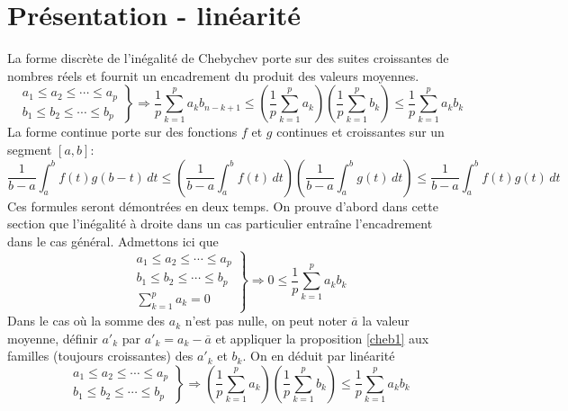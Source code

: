 
\section{Présentation - linéarité}
La forme discrète de l'inégalité de Chebychev porte sur des suites croissantes de nombres réels et fournit un encadrement du produit des valeurs moyennes.
\begin{displaymath}
\left.
\begin{aligned}
  &a_1\leq a_2\leq \cdots \leq a_p\\ &b_1\leq b_2\leq \cdots \leq b_p 
\end{aligned}
\right\rbrace 
\Rightarrow
\frac{1}{p}\sum_{k=1}^p a_kb_{n-k+1}
\leq \left(\frac{1}{p}\sum_{k=1}^p a_k \right) \left(\frac{1}{p}\sum_{k=1}^p b_k \right)
\leq \frac{1}{p}\sum_{k=1}^p a_kb_k 
\end{displaymath}
La forme continue porte sur des fonctions $f$ et $g$ continues et croissantes sur un segment $[a,b]$:
\begin{displaymath}
\frac{1}{b-a}\int_{a}^b f(t)g(b-t)\, dt
\leq \left(\frac{1}{b-a}\int_{a}^b f(t)\, dt \right) \left(\frac{1}{b-a}\int_{a}^b g(t)\, dt \right)
\leq \frac{1}{b-a}\int_{a}^b f(t)g(t)\, dt 
\end{displaymath}
Ces formules seront démontrées en deux temps. On prouve d'abord dans cette section que l'inégalité à droite dans un cas particulier entraîne l'encadrement dans le cas général.\newline
Admettons ici que
\begin{equation}
\left.
\begin{aligned}
  &a_1\leq a_2\leq \cdots \leq a_p\\ &b_1\leq b_2\leq \cdots \leq b_p \\ &\sum_{k=1}^p a_k = 0
\end{aligned}
\right\rbrace 
\Rightarrow
0 \leq \frac{1}{p}\sum_{k=1}^p a_kb_k
\label{cheb1}
\end{equation}
Dans le cas où la somme des $a_k$ n'est pas nulle, on peut noter $\overline{a}$ la valeur moyenne, définir $a'_k$ par $a'_k = a_k -\overline{a}$ et appliquer la proposition \ref{cheb1} aux familles (toujours croissantes) des $a'_k$ et $b_k$. On en déduit par linéarité 
\begin{equation}
\left.
\begin{aligned}
  &a_1\leq a_2\leq \cdots \leq a_p\\ &b_1\leq b_2\leq \cdots \leq b_p
\end{aligned}
\right\rbrace 
\Rightarrow
\left(\frac{1}{p}\sum_{k=1}^p a_k \right) \left(\frac{1}{p}\sum_{k=1}^p b_k \right)
\leq \frac{1}{p}\sum_{k=1}^p a_kb_k
\label{cheb2}
\end{equation}

